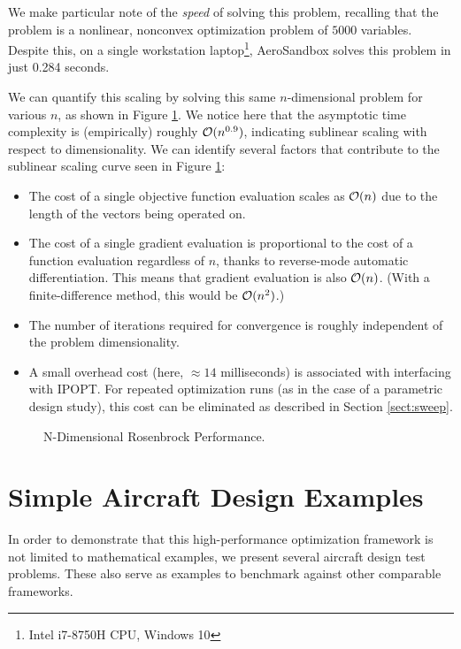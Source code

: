 We make particular note of the \textit{speed} of solving this problem, recalling that the problem is a nonlinear, nonconvex optimization problem of $5000$ variables. Despite this, on a single workstation laptop\footnote{Intel i7-8750H CPU, Windows 10}, AeroSandbox solves this problem in just 0.284 seconds.

We can quantify this scaling by solving this same $n$-dimensional problem for various $n$, as shown in Figure \ref{fig:nd-rosen}. We notice here that the asymptotic time complexity is (empirically) roughly $\mathcal{O}(n^{0.9})$, indicating sublinear scaling with respect to dimensionality. We can identify several factors that contribute to the sublinear scaling curve seen in Figure \ref{fig:nd-rosen}:

\begin{itemize}
    \item The cost of a single objective function evaluation scales as $\mathcal{O}(n)$ due to the length of the vectors being operated on.
    \item The cost of a single gradient evaluation is proportional to the cost of a function evaluation regardless of $n$, thanks to reverse-mode automatic differentiation. This means that gradient evaluation is also $\mathcal{O}(n)$. (With a finite-difference method, this would be $\mathcal{O}(n^2)$.)
    \item The number of iterations required for convergence is roughly independent of the problem dimensionality.
    \item A small overhead cost (here, $\approx 14$ milliseconds) is associated with interfacing with IPOPT. For repeated optimization runs (as in the case of a parametric design study), this cost can be eliminated as described in Section \ref{sect:sweep}. %
\end{itemize}

\begin{figure}[H]
    \centering
    \ifdraft{}{}
    \caption{N-Dimensional Rosenbrock Performance. }
    \label{fig:nd-rosen}
\end{figure}


\section{Simple Aircraft Design Examples}

In order to demonstrate that this high-performance optimization framework is not limited to mathematical examples, we present several aircraft design test problems. These also serve as examples to benchmark against other comparable frameworks.

